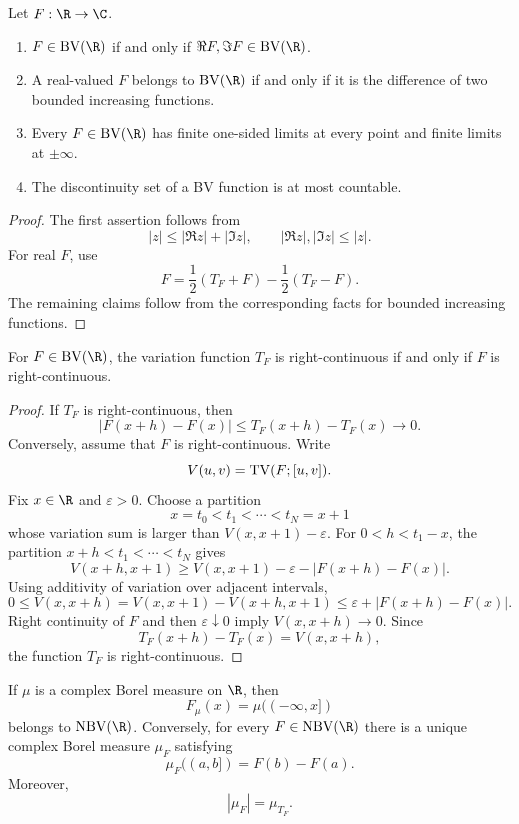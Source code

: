 \begin{thm}[Characterizations of $\BV(\R)$]
Let $F:\R\to\C$.
\begin{enumerate}
  \item $F\in\BV(\R)$ if and only if $\Re F,\Im F\in\BV(\R)$.
  \item A real-valued $F$ belongs to $\BV(\R)$ if and only if it is the difference of two bounded increasing functions.
  \item Every $F\in\BV(\R)$ has finite one-sided limits at every point and finite limits at $\pm\infty$.
  \item The discontinuity set of a BV function is at most countable.
\end{enumerate}
\end{thm}

\begin{proof}
The first assertion follows from
\[
|z|\leq|\Re z|+|\Im z|,
\qquad |\Re z|,|\Im z|\leq|z|.
\]
For real $F$, use
\[
F=\frac12(T_F+F)-\frac12(T_F-F).
\]
The remaining claims follow from the corresponding facts for bounded increasing functions.
\end{proof}

\begin{prop}
For $F\in\BV(\R)$, the variation function $T_F$ is right-continuous if and only if $F$ is right-continuous.
\end{prop}

\begin{proof}
If $T_F$ is right-continuous, then
\[
|F(x+h)-F(x)|\leq T_F(x+h)-T_F(x)\to0.
\]
Conversely, assume that $F$ is right-continuous. Write
\[
V(u,v)=\operatorname{TV}(F;[u,v]).
\]
Fix $x\in\R$ and $\varepsilon>0$. Choose a partition
\[
x=t_0<t_1<\cdots<t_N=x+1
\]
whose variation sum is larger than $V(x,x+1)-\varepsilon$. For $0<h<t_1-x$, the partition $x+h<t_1<\cdots<t_N$ gives
\[
V(x+h,x+1)
\geq V(x,x+1)-\varepsilon-|F(x+h)-F(x)|.
\]
Using additivity of variation over adjacent intervals,
\[
0\leq V(x,x+h)
=V(x,x+1)-V(x+h,x+1)
\leq\varepsilon+|F(x+h)-F(x)|.
\]
Right continuity of $F$ and then $\varepsilon\downarrow0$ imply $V(x,x+h)\to0$. Since
\[
T_F(x+h)-T_F(x)=V(x,x+h),
\]
the function $T_F$ is right-continuous.
\end{proof}

\begin{thm}
If $\mu$ is a complex Borel measure on $\R$, then
\[
F_\mu(x)=\mu(( -\infty,x])
\]
belongs to $\NBV(\R)$. Conversely, for every $F\in\NBV(\R)$ there is a unique complex Borel measure $\mu_F$ satisfying
\[
\mu_F((a,b])=F(b)-F(a).
\]
Moreover,
\[
|\mu_F|=\mu_{T_F}.
\]
\end{thm}

